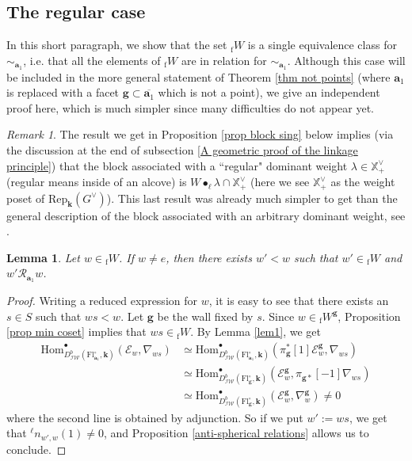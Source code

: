 \documentclass[11pt]{amsart}
\theoremstyle{plain}
\newtheorem{lem}[thm]{Lemma}
\theoremstyle{remark}
\newtheorem{rem}[thm]{Remark}
\numberwithin{equation}{section}
\begin{document}
	\subsection{The regular case}
	In this short paragraph, we show that  the set ${_{\mathrm{f}}W}$ is a single equivalence class for $\sim_{\mathbf{a}_1}$, i.e. that all the elements of ${_{\mathrm{f}}W}$ are in relation for $\sim_{\mathbf{a}_1}$. Although this case will be included in the more general statement of Theorem \ref{thm not points} (where $\mathbf{a}_1$ is replaced with a facet $\mathbf{g}\subset\overline{\mathbf{a}_1}$ which is not a point), we give an independent proof here, which is much simpler since many difficulties do not appear yet.
	\begin{rem}
	  The result we get in Proposition \ref{prop block sing} below implies (via the discussion at the end of subsection \ref{A geometric proof of the linkage principle}) that the block associated with a ``regular" dominant weight $\lambda\in \mathbb{X}^\vee_+$ (regular means inside of an alcove) is $W\bullet_\ell\lambda\cap\mathbb{X}^\vee_+$ (here we see $\mathbb{X}^\vee_+$ as the weight poset of $\mathrm{Rep}_\mathbf{k}(G^\vee)$). This last result was already much simpler to get than the general description of the block associated with an arbitrary dominant weight, see \cite[§2.4]{humphreys1978blocks}.
	\end{rem}
	\begin{lem}\label{lem reg bl}
		Let $w\in {_{\mathrm{f}}W}$. If $w\neq e$, then there exists $w'<w$ such that $w'\in{_\mathrm{f}W}$ and $w'\mathscr{R}_{\mathbf{a}_1} w$.
	\end{lem}
	\begin{proof}
		Writing a reduced expression for $w$, it is easy to see that there exists an $s\in S$ such that $ws<w$. Let $\mathbf{g}$ be the wall fixed by $s$. Since $w\in {_{\mathrm{f}}W}^\mathbf{g}$, Proposition \ref{prop min coset} implies that $ws\in {_{\mathrm{f}}W}$. By Lemma \ref{lem1}, we get
		\begin{align*}
			\mathrm{Hom}_{D^b_{\mathcal{IW}}(\mathrm{Fl}^{\circ}_{\mathbf{a}_1},\mathbf{k})}^\bullet(\mathcal{E}_w,\nabla_{ws})&\simeq \mathrm{Hom}_{D^b_{\mathcal{IW}}(\mathrm{Fl}^{\circ}_{\mathbf{a}_1},\mathbf{k})}^\bullet(\pi_{\mathbf{g}}^*[1]\mathcal{E}_w^{\mathbf{g}},\nabla_{ws})\\
			&\simeq \mathrm{Hom}_{D^b_{\mathcal{IW}}(\mathrm{Fl}^{\circ}_{\mathbf{g}},\mathbf{k})}^\bullet(\mathcal{E}_w^{\mathbf{g}},\pi_{\mathbf{g}*}[-1]\nabla_{ws})\\
			&\simeq \mathrm{Hom}_{D^b_{\mathcal{IW}}(\mathrm{Fl}^{\circ}_{\mathbf{g}},\mathbf{k})}^\bullet(\mathcal{E}_w^{\mathbf{g}},\nabla_{w}^{\mathbf{g}})\neq 0
		\end{align*}
		where the second line is obtained by adjunction. So if we put $w':=ws$, we get that ${^\ell n}_{w',w}(1)\neq 0$, and Proposition \ref{anti-spherical relations} allows us to conclude.
	\end{proof}
\end{document}
